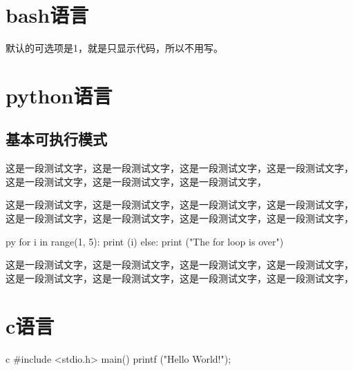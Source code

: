 \documentclass[11pt,oneside]{book}
\begin{document}
\begin{common-format}
\mainmatter


\chapter{bash语言}
默认的可选项是1，就是只显示代码，所以不用写。

\chapter{python语言}
\section{基本可执行模式}
这是一段测试文字，这是一段测试文字，这是一段测试文字，这是一段测试文字，这是一段测试文字，这是一段测试文字，这是一段测试文字，

这是一段测试文字，这是一段测试文字，这是一段测试文字，这是一段测试文字，这是一段测试文字，这是一段测试文字，这是一段测试文字，这是一段测试文字，
\begin{xverbatim}[129]{py}
for i in range(1, 5):
    print (i)
else:
    print ("The for loop is over")
\end{xverbatim}
这是一段测试文字，这是一段测试文字，这是一段测试文字，这是一段测试文字，这是一段测试文字，这是一段测试文字，这是一段测试文字，这是一段测试文字，




\chapter{c语言}
\begin{xverbatim}[1]{c}
#include <stdio.h>
main()
{
printf ("Hello World!\n");
}
\end{xverbatim}


\end{common-format}
\end{document}
